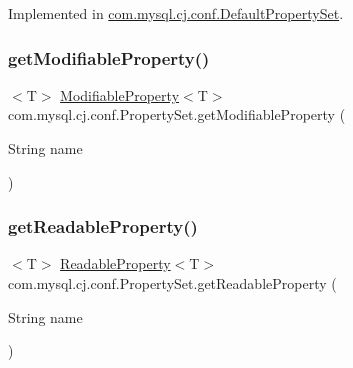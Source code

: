 Implemented in \mbox{\hyperlink{classcom_1_1mysql_1_1cj_1_1conf_1_1_default_property_set_ae7157aefbd409a972ffe014ab383d25b}{com.\+mysql.\+cj.\+conf.\+Default\+Property\+Set}}.

\mbox{\label{interfacecom_1_1mysql_1_1cj_1_1conf_1_1_property_set_a1f0bf657fdc759cd12424b7820811aac}} 
\subsubsection{\texorpdfstring{get\+Modifiable\+Property()}{getModifiableProperty()}}
{\footnotesize\ttfamily $<$T$>$ \mbox{\hyperlink{interfacecom_1_1mysql_1_1cj_1_1conf_1_1_modifiable_property}{Modifiable\+Property}}$<$T$>$ com.\+mysql.\+cj.\+conf.\+Property\+Set.\+get\+Modifiable\+Property (\begin{DoxyParamCaption}\item[{String}]{name }\end{DoxyParamCaption})}

\mbox{\label{interfacecom_1_1mysql_1_1cj_1_1conf_1_1_property_set_ad9a13aa18068c412578a86b8afd619f0}} 
\subsubsection{\texorpdfstring{get\+Readable\+Property()}{getReadableProperty()}}
{\footnotesize\ttfamily $<$T$>$ \mbox{\hyperlink{interfacecom_1_1mysql_1_1cj_1_1conf_1_1_readable_property}{Readable\+Property}}$<$T$>$ com.\+mysql.\+cj.\+conf.\+Property\+Set.\+get\+Readable\+Property (\begin{DoxyParamCaption}\item[{String}]{name }\end{DoxyParamCaption})}

